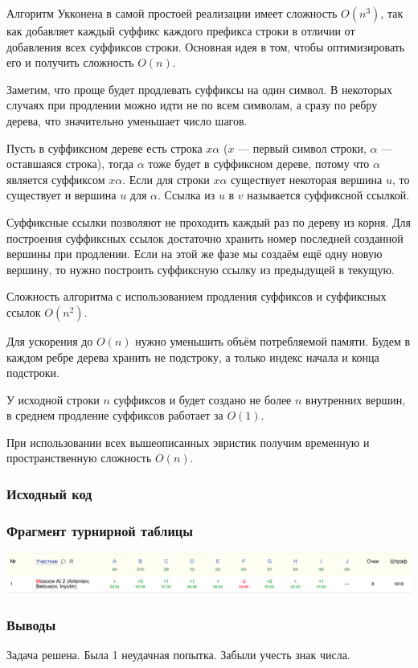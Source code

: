 Алгоритм Укконена в самой простоей реализации имеет сложность $O(n^3)$, так как добавляет каждый суффикс каждого префикса строки в отличии от добавления всех суффиксов строки. Основная идея в том, чтобы оптимизировать его и получить сложность $O(n)$.

Заметим, что проще будет продлевать суффиксы на один символ. В некоторых случаях при продлении можно идти не по всем символам, а сразу по ребру дерева, что значительно уменьшает число шагов.

Пусть в суффиксном дереве есть строка $x\alpha$ ($x$ --- первый символ строки, $\alpha$ --- оставшаяся строка), тогда $\alpha$ тоже будет в суффиксном дереве, потому что $\alpha$ является суффиксом $x\alpha$. Если для строки $x\alpha$ существует некоторая вершина $u$, то существует и вершина $u$ для $\alpha$. Ссылка из $u$ в $v$ называется суффиксной ссылкой.

Суффиксные ссылки позволяют не проходить каждый раз по дереву из корня. Для построения суффиксных ссылок достаточно хранить номер последней созданной вершины при продлении. Если на этой же фазе мы создаём ещё одну новую вершину, то нужно построить суффиксную ссылку из предыдущей в текущую.

Сложность алгоритма с использованием продления суффиксов и суффиксных ссылок $O(n^2)$.

Для ускорения до $O(n)$ нужно уменьшить объём потребляемой памяти. Будем в каждом ребре дерева хранить не подстроку, а только индекс начала и конца подстроки.

У исходной строки $n$ суффиксов и будет создано не более $n$ внутренних вершин, в среднем продление суффиксов работает за $O(1)$.

При использовании всех вышеописанных эвристик получим временную и пространственную сложность $O(n)$.
\subsubsection*{Исходный код}

\subsubsection*{Фрагмент турнирной таблицы}
\includegraphics[width=\textwidth]{images/220422.png}\newline\noindent
\subsubsection*{Выводы}
Задача решена. Была 1 неудачная попытка. Забыли учесть знак числа.
\pagebreak

